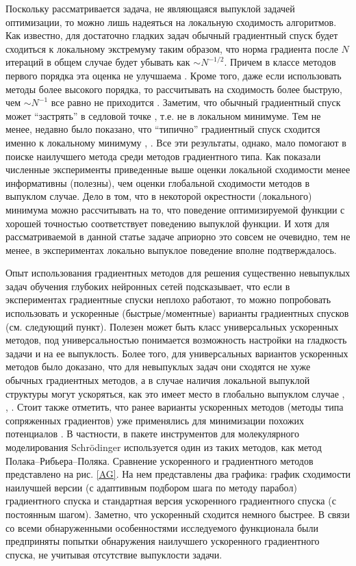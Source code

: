   Поскольку рассматривается задача, не являющаяся выпуклой задачей оптимизации, то можно лишь надеяться на локальную сходимость алгоритмов. Как известно, для достаточно гладких задач обычный градиентный спуск будет сходиться к локальному экстремуму таким образом, что норма градиента после $N$ итераций в общем случае будет убывать как $\sim N^{-1/2}$. Причем в классе методов первого порядка эта оценка не улучшаема  \cite{carmon2017lower2}. Кроме того, даже если использовать методы более высокого порядка, то рассчитывать на сходимость более быструю, чем $\sim N^{-1}$ все равно не приходится \cite{carmon2017lower1}. Заметим, что обычный градиентный спуск может ``застрять'' в седловой точке \cite{nesterov2013introductory}, т.е. не в локальном минимуме. Тем не менее, недавно было показано, что ``типично'' градиентный спуск сходится именно к локальному минимуму \cite{lee2017first}, \cite{lee2016gradient}. Все эти результаты, однако, мало помогают в поиске наилучшего метода среди методов градиентного типа. Как показали численные эксперименты приведенные выше оценки локальной сходимости менее информативны (полезны), чем оценки глобальной сходимости методов в выпуклом случае. Дело в том, что в некоторой окрестности (локального) минимума можно рассчитывать на то, что поведение оптимизируемой функции с хорошей точностью соответствует поведению выпуклой функции. И хотя для рассматриваемой в  данной статье задаче априорно это совсем не очевидно, тем не менее, в экспериментах локально выпуклое поведение вполне подтверждалось.  

  Опыт использования градиентных методов для решения существенно невыпуклых задач обучения глубоких нейронных сетей \cite{Goodfellow2017} подсказывает, что если в экспериментах градиентные спуски неплохо работают, то можно попробовать использовать и ускоренные (быстрые/моментные) варианты градиентных спусков (см. следующий пункт). 
  Полезен может быть класс универсальных ускоренных методов, под универсальностью понимается возможность настройки на гладкость задачи и на ее выпуклость. Более того, для универсальных вариантов ускоренных методов было доказано, что для невыпуклых задач они сходятся не хуже обычных градиентных методов, а в случае наличия локальной выпуклой структуры могут ускоряться, как это имеет место в глобально выпуклом случае \cite{ghadimi2015generalized}, \cite{guminov2019accelerated}, \cite{guminov2019universal}. Стоит также отметить, что ранее варианты ускоренных методов (методы типа сопряженных градиентов) уже применялись для минимизации похожих потенциалов \cite{wales1997global}. В частности, в пакете инструментов для молекулярного моделирования Schrödinger \cite{sastry2013protein} используется один из таких методов, как метод Полака--Рибьера--Поляка. Сравнение ускоренного и градиентного методов представлено на рис. \ref{AG}.  На нем представлены два графика: график сходимости наилучшей версии (с адаптивным подбором шага по методу парабол) градиентного спуска и стандартная версия ускоренного градиентного спуска (с постоянным шагом). Заметно, что ускоренный сходится немного быстрее. В связи со всеми обнаруженными особенностями исследуемого функционала были предприняты попытки обнаружения наилучшего ускоренного градиентного спуска, не учитывая отсутствие выпуклости задачи. 

